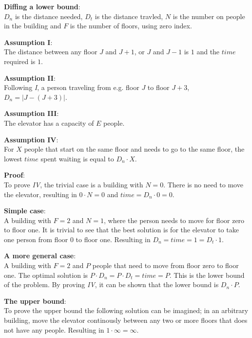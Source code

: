 
\textbf{Diffing a lower bound}:
\\
$ D_n $ is the distance needed, $ D_t $ is the distance travled, $ N $ is the number on people in the building and $ F $ is the number of floors, using zero index.

\textbf{Assumption I}:
\\
The distance between any floor $ J $ and $ J + 1 $, or  $ J $ and $ J - 1 $ is $ 1 $ and the $ time $ required is $ 1 $.

\textbf{Assumption II}:
\\
Following \textit{I}, a person traveling from e.g. floor $ J $ to floor $ J + 3 $, $ D_n = |J - ( J + 3)|$.

\textbf{Assumption III}:
\\
The elevator has a capacity of $ E $ people.

\textbf{Assumption IV}:
\\
For $ X $ people that start on the same floor and needs to go to the same floor, the lowest $ time $ spent waiting is equal to $ D_n \cdot X $.

\textbf{Proof}:
\\
To prove \textit{IV}, the trivial case is a building with $ N = 0 $. There is no need to move the elevator, resulting in $ 0 \cdot N = 0 $ and $ time = D_n \cdot 0 = 0 $.

\textbf{Simple case}:
\\
A building with $ F = 2 $ and $ N = 1 $, where the person needs to move for floor zero to floor one. It is trivial to see that the best solution is for the elevator to take one person from floor 0 to floor one. Resulting in $ D_n = time = 1 = D_t \cdot 1 $.

\textbf{A more general case}:
\\
A building with $ F = 2 $ and $ P $ people that need to move from floor zero to floor one. The optimal solution is $ P \cdot D_n = P \cdot D_t = time = P $. This is the lower bound of the problem. By proving \textit{IV}, it can be shown that the lower bound is $ D_n \cdot P $.

\textbf{The upper bound}:
\\
To prove the upper bound the following solution can be imagined; in an arbitrary building, move the elevator continously between any two or more floors that does not have any people. Resulting in $ 1 \cdot \infty = \infty $.
